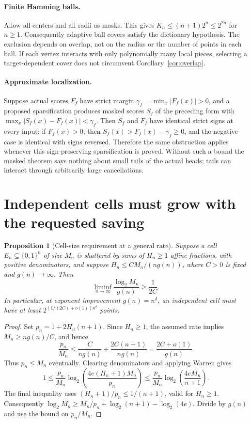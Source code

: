 \documentclass[11pt]{article}
\newtheorem{proposition}[theorem]{Proposition}
\newcommand{\Qn}{\{0,1\}^n}
\begin{document}
\paragraph{Finite Hamming balls.}
Allow all centers and all radii as masks. This gives
$K_n\leq(n+1)2^n\leq2^{2n}$ for $n\geq1$.
Consequently adaptive ball covers satisfy the dictionary hypothesis.
The exclusion depends on overlap, not on the radius or the number of
points in each ball. If each vertex interacts with only polynomially
many local pieces, selecting a target-dependent cover does not circumvent
Corollary~\ref{cor:overlap}.

\paragraph{Approximate localization.}
Suppose actual scores $F_f$ have strict margin
$\gamma_f=\min_x|F_f(x)|>0$, and a proposed sparsification produces
masked scores $S_f$ of the preceding form with
$\max_x|S_f(x)-F_f(x)|<\gamma_f$.
Then $S_f$ and $F_f$ have identical strict signs at every input: if
$F_f(x)>0$, then $S_f(x)>F_f(x)-\gamma_f\geq0$, and the negative
case is identical with signs reversed. Therefore the same obstruction
applies whenever this sign-preserving sparsification is proved.
Without such a bound the masked theorem says nothing about small tails
of the actual heads; tails can interact through arbitrarily large
cancellations.

\section{Independent cells must grow with the requested saving}

\begin{proposition}[Cell-size requirement at a general rate]
Suppose a cell $E_n\subseteq\Qn$ of size $M_n$ is shattered by sums
of $H_n\geq1$ affine fractions, with positive denominators, and suppose
$H_n\leq CM_n/(ng(n))$, where $C>0$ is fixed and $g(n)\to\infty$.
Then
\[
 \liminf_{n\to\infty}\frac{\log_2 M_n}{g(n)}\geq\frac1{2C}.
\]
In particular, at exponent improvement $g(n)=n^\delta$, an independent
cell must have at least $2^{(1/(2C)+o(1))n^\delta}$ points.
\end{proposition}
\begin{proof}
Set $p_n=1+2H_n(n+1)$. Since $H_n\geq1$, the assumed rate implies
$M_n\geq ng(n)/C$, and hence
\[
 \frac{p_n}{M_n}\leq\frac{C}{ng(n)}+
 \frac{2C(n+1)}{ng(n)}=\frac{2C+o(1)}{g(n)}.
\]
Thus $p_n\leq M_n$ eventually. Clearing denominators and applying
Warren gives
\[
 1\leq\frac{p_n}{M_n}
 \log_2\left(\frac{4e(H_n+1)M_n}{p_n}\right)
 \leq\frac{p_n}{M_n}
 \log_2\left(\frac{4eM_n}{n+1}\right).
\]
The final inequality uses
$(H_n+1)/p_n\leq1/(n+1)$, valid for $H_n\geq1$.
Consequently
$\log_2 M_n\geq M_n/p_n+\log_2(n+1)-\log_2(4e)$.
Divide by $g(n)$ and use the bound on $p_n/M_n$.
\end{proof}
\end{document}
